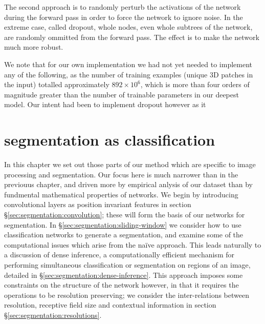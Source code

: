\documentclass[msc]{infthesis}
\begin{document}
The second approach is to randomly perturb the activations of the network during the forward pass
in order to force the network to ignore noise.  In the extreme case, called dropout, whole nodes,
even whole subtrees of the network, are randomly ommitted from the forward pass.  The effect is to
make the network much more robust.\cite{srivastava2014dropout}

We note that for our own implementation we had not yet needed to implement any of the following, as
the number of training examples (unique 3D patches in the input) totalled approximately 
\(892 \times 10^{6}\), which is more than four orders of magnitude greater than the number of
trainable parameters in our deepest model.  Our intent had been to implement dropout however as
it 







\chapter{segmentation as classification}





\label{sec:segmentation}
In this chapter we set out those parts of our method which are specific to image processing and
segmentation.  Our focus here is much narrower than in the previouus chapter, and driven more by
empirical anlysis of our dataset than by fundmental mathematical properties of networks.  We
begin by introducing convolutional layers as position invariant features in section
\S\ref{sec:segmentation:convolution}; these will form the basis of our networks for segmentation.
In \S\ref{sec:segmentation:sliding-window} we consider how to use classification networks to generate
a segmentation, and examine some of the computational issues which arise from the na\"ive approach.
This leads naturally to a discussion of dense inference, a computationally efficient mechanism for
performing simultaneous classification or segmentation on regions of an image, detailed in
\S\ref{sec:segmentation:dense-inference}.  This approach imposes some constraints on the structure
of the network however, in that it requires the operations to be resolution preserving; we consider
the inter-relations between resolution, receptive field size and contextual information in section
\S\ref{sec:segmentation:resolutions}.
\end{document}
